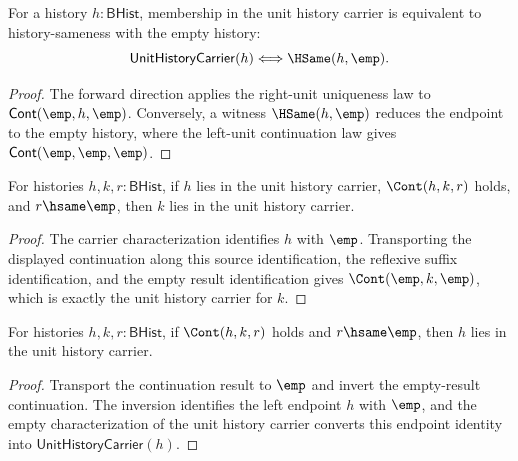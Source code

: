 \begin{theorem}
\label{thm:unit-history-carrier-empty-iff}
For a history $h:\mathsf{BHist}$, membership in the unit history carrier is
equivalent to history-sameness with the empty history:
$$
\mathsf{UnitHistoryCarrier}(h)\Longleftrightarrow \HSame(h,\emp).
$$
\end{theorem}
\begin{proof}
The forward direction applies the right-unit uniqueness law to
$\mathsf{Cont}(\emp,h,\emp)$. Conversely, a witness $\HSame(h,\emp)$ reduces
the endpoint to the empty history, where the left-unit continuation law gives
$\mathsf{Cont}(\emp,\emp,\emp)$.
\end{proof}

\begin{theorem}
\label{thm:unit-history-carrier-continuation-suffix-closed}
For histories $h,k,r:\mathsf{BHist}$, if $h$ lies in the unit history carrier,
$\Cont(h,k,r)$ holds, and $r\hsame\emp$, then $k$ lies in the unit history
carrier.
\end{theorem}
\begin{proof}
The carrier characterization identifies $h$ with $\emp$. Transporting the
displayed continuation along this source identification, the reflexive suffix
identification, and the empty result identification gives
$\Cont(\emp,k,\emp)$, which is exactly the unit history carrier for $k$.
\end{proof}

\begin{theorem}
\label{thm:unit-history-carrier-continuation-prefix-closed}
For histories $h,k,r:\mathsf{BHist}$, if $\Cont(h,k,r)$ holds and
$r\hsame\emp$, then $h$ lies in the unit history carrier.
\end{theorem}
\begin{proof}
Transport the continuation result to $\emp$ and invert the empty-result
continuation. The inversion identifies the left endpoint $h$ with $\emp$, and
the empty characterization of the unit history carrier converts this endpoint
identity into $\mathsf{UnitHistoryCarrier}(h)$.
\end{proof}

